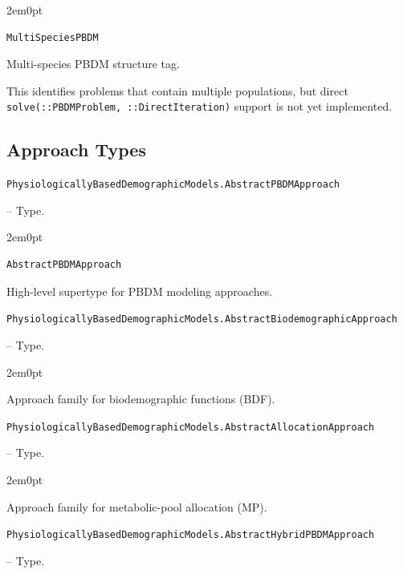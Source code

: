 \begin{adjustwidth}{2em}{0pt}


\begin{verbatim}
MultiSpeciesPBDM
\end{verbatim}

Multi-species PBDM structure tag.

This identifies problems that contain multiple populations, but direct \texttt{solve(::PBDMProblem, ::DirectIteration)} support is not yet implemented.



\end{adjustwidth}

\subsection{Approach Types}



\label{9819237321385295265}{}

\hypertarget{14052672418462127645}{\texttt{PhysiologicallyBasedDemographicModels.AbstractPBDMApproach}}  -- {Type.}

\begin{adjustwidth}{2em}{0pt}


\begin{verbatim}
AbstractPBDMApproach
\end{verbatim}

High-level supertype for PBDM modeling approaches.



\end{adjustwidth}
\hypertarget{5589457620090627160}{\texttt{PhysiologicallyBasedDemographicModels.AbstractBiodemographicApproach}}  -- {Type.}

\begin{adjustwidth}{2em}{0pt}

Approach family for biodemographic functions (BDF).



\end{adjustwidth}
\hypertarget{13978410032889623288}{\texttt{PhysiologicallyBasedDemographicModels.AbstractAllocationApproach}}  -- {Type.}

\begin{adjustwidth}{2em}{0pt}

Approach family for metabolic-pool allocation (MP).



\end{adjustwidth}
\hypertarget{16001478930585382261}{\texttt{PhysiologicallyBasedDemographicModels.AbstractHybridPBDMApproach}}  -- {Type.}

